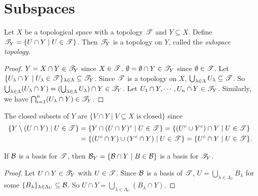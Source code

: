 \section*{Subspaces}

\begin{proposition}
    Let $X$ be a topological space with a topology $\mathscr{T}$ and $Y \subseteq X$. Define $\mathscr{T}_Y = \{U \cap Y \mid U \in \mathscr{T}\}$. Then $\mathscr{T}_Y$ is a topology on $Y$, called the \emph{subspace topology}.
\end{proposition}

\begin{proof}
    $Y = X \cap Y \in \mathscr{T}_Y$ since $X \in \mathscr{T}$. $\emptyset = \emptyset \cap Y  \in \mathscr{T}_Y$ since $\emptyset \in \mathscr{T}$. Let $\{U_\lambda \cap Y \mid U_\lambda \in \mathscr{T}\}_{\lambda \in \Lambda} \subseteq \mathscr{T}_Y$. Since $\mathscr{T}$ is a topology on $X$, $\bigcup_{\lambda \in \Lambda} U_\lambda \subseteq \mathscr{T}$. So $\bigcup_{\lambda \in \Lambda} (U_\lambda \cap Y) = (\bigcup_{\lambda \in \Lambda}U_\lambda) \cap Y \in \mathscr{T}_Y$. Let $U_1 \cap Y,\cdots,U_n \cap Y \in \mathscr{T}_Y$. Similarly, we have $\bigcap_{i=1}^n (U_\lambda \cap Y) \in \mathscr{T}_Y$. 
\end{proof}

\begin{remark}
    The closed subsets of $Y$ are $\{V \cap Y \mid V \subseteq X \text{ is closed}\}$ since 
    \begin{align*}
        \{Y \setminus (U \cap Y) \mid U \in \mathscr{T}\} &= \{Y \cap (U \cap Y)^c \mid U \in \mathscr{T}\} = \{(U^c \cup Y^c) \cap Y \mid U \in \mathscr{T}\} \\
                                                   &= \{(U^c \cap Y) \cup (Y^c \cap Y) \mid U \in \mathscr{T}\} = \{U^c \cap Y \mid U \in \mathscr{T}\}.
    \end{align*}
\end{remark}

\begin{proposition}
    If $\mathcal{B}$ is a basis for $\mathscr{T}$, then $\mathcal{B}_Y = \{\mathcal{B} \cap Y \mid B \in \mathcal{B}\}$ is a basis for $\mathscr{T}_Y$.
\end{proposition}

\begin{proof}
    Let $U \cap Y \in \mathscr{T}_Y$ with $U \in \mathscr{T}$. Since $\mathcal{B}$ is a basis of $\mathscr{T}$, $U = \bigcup_{\lambda \in \Lambda_U} B_\lambda$ for some $\{B_\lambda\}_{\lambda \in \Lambda_U} \subseteq \mathcal{B}$. So $U \cap Y = \bigcup_{\lambda \in \Lambda_U} (B_\lambda \cap Y)$. 
\end{proof}

